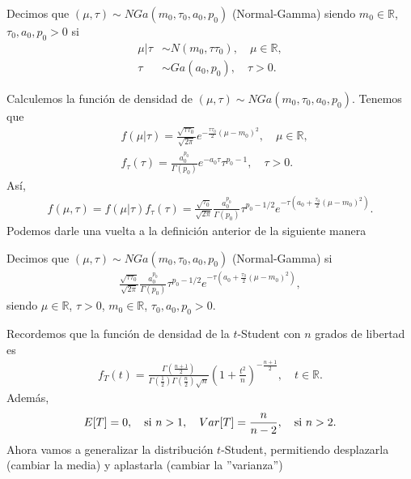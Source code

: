 \begin{defi}
    Decimos que $(\mu, \tau) \sim NGa(m_0, \tau_0, a_0, p_0)$ (Normal-Gamma) siendo $m_0 \in \mathbb{R}$, $\tau_0,a_0,p_0 > 0$ si
    \begin{align*}
        \mu | \tau &\sim N(m_0, \tau \tau_0), \quad \mu \in \mathbb{R}, \\
        \tau &\sim Ga(a_0,p_0), \quad \tau > 0.
    \end{align*}
\end{defi}
Calculemos la función de densidad de $(\mu, \tau) \sim NGa(m_0, \tau_0, a_0, p_0)$. Tenemos que
\begin{align*}
    &f(\mu | \tau) = \frac{\sqrt{\tau \tau_0}}{\sqrt{2\pi}} e^{- \frac{\tau \tau_0}{2}(\mu - m_0)^2}, \quad \mu \in \mathbb{R}, \\
    & f_{\tau}(\tau) = \frac{a_0^{p_0}}{\Gamma(p_0)} e^{-a_0\tau} \tau^{p_0-1}, \quad \tau > 0.
\end{align*}
Así,
\begin{align*}
    f(\mu,\tau) = f(\mu | \tau) f_{\tau}(\tau) = \frac{\sqrt{ \tau_0}}{\sqrt{2\pi}} \frac{a_0^{p_0}}{\Gamma(p_0)} \tau^{p_0 - 1/2} e^{-\tau\left( a_0 + \frac{\tau_0}{2}(\mu - m_0)^2 \right)}.
\end{align*}
Podemos darle una vuelta a la definición anterior de la siguiente manera
\begin{defi}
    Decimos que $(\mu, \tau) \sim NGa(m_0, \tau_0, a_0, p_0)$ (Normal-Gamma) si
    \begin{align*}
        \frac{\sqrt{\tau \tau_0}}{\sqrt{2\pi}} \frac{a_0^{p_0}}{\Gamma(p_0)} \tau^{p_0 - 1/2} e^{-\tau\left( a_0 + \frac{\tau_0}{2}(\mu - m_0)^2 \right)},
    \end{align*}    
    siendo  $\mu \in \mathbb{R}$, $\tau > 0$, $m_0 \in \mathbb{R}$, $\tau_0,a_0,p_0 > 0$.
\end{defi}
Recordemos que la función de densidad de la $t$-Student  con $n$ grados de libertad es
\begin{align*}
    f_T(t) = \frac{\Gamma\left( \frac{n+1}{2} \right)}{\Gamma\left( \frac{1}{2} \right)\Gamma\left( \frac{n}{2} \right)\sqrt{n}} \left(1 + \frac{t^2}{n} \right)^{-\frac{n+1}{2}}, \quad t \in \mathbb{R}.
\end{align*}
Además,
\begin{align*}
    E[T] = 0, \quad \text{si $ n > 1$}, \quad Var[T] = \frac{n}{n-2}, \quad \text{si $n >2$}.
\end{align*}
Ahora vamos a generalizar la distribución $t$-Student, permitiendo desplazarla (cambiar la media) y aplastarla (cambiar la ''varianza'')
